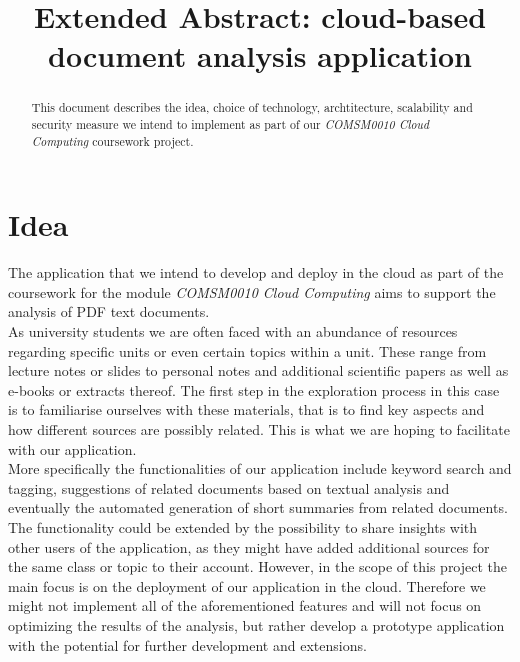 \documentclass[conference]{IEEEtran}
\begin{document}
\title{Extended Abstract: cloud-based document analysis application}

\author{
\and
{}
}

\maketitle

\begin{abstract}
This document describes the idea, choice of technology, archtitecture, scalability and security measure
we intend to implement as part of our \textit{COMSM0010 Cloud Computing} coursework project.
\end{abstract}

\section{Idea}
The application that we intend to develop and deploy in the cloud as part of the coursework for the module 
\textit{COMSM0010 Cloud Computing} aims to support the analysis of PDF text documents. \\
As university students we are often faced with an abundance of resources regarding specific units or even
certain topics within a unit. These range from lecture notes or slides to personal notes and additional
scientific papers as well as e-books or extracts thereof. The first step in the exploration process in this
case is to familiarise ourselves with these materials, that is to find key aspects and how different sources
are possibly related. This is what we are hoping to facilitate with our application. \\
More specifically the functionalities of our application include keyword search and tagging, suggestions of
related documents based on textual analysis and eventually the automated generation of short summaries from
related documents. The functionality could be extended by the possibility to share insights with other users
of the application, as they might have added additional sources for the same class or topic to their account.
However, in the scope of this project the main focus is on the deployment of our application in the cloud.
Therefore we might not implement all of the aforementioned features and will not focus on optimizing the 
results of the analysis, but rather develop a prototype application with the potential for further 
development and extensions. \\
\end{document}
